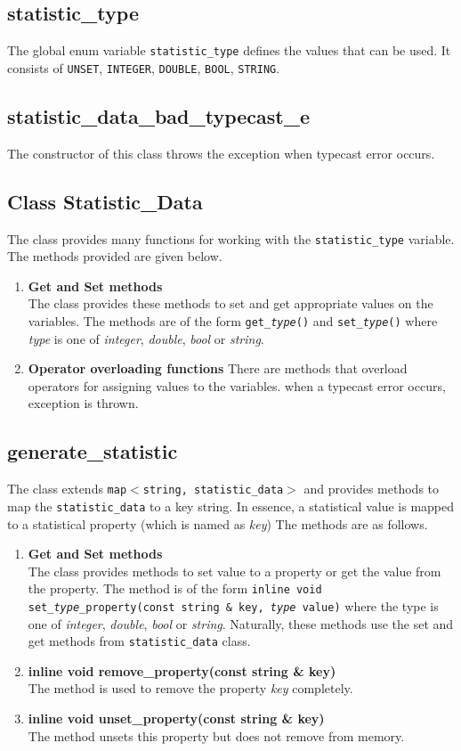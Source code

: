 \subsection*{statistic\_type}
The global enum variable \texttt{statistic\_type} defines the values that can be used. It consists of \texttt{UNSET}, \texttt{INTEGER}, \texttt{DOUBLE}, \texttt{BOOL}, \texttt{STRING}.
\subsection*{statistic\_data\_bad\_typecast\_e}
The constructor of this class throws the exception when typecast error occurs.
\subsection*{Class Statistic\_Data}
The class provides many functions for working with the \texttt{statistic\_type} variable. The methods provided are given below.
\begin{enumerate}
 \item \textbf{Get and Set methods}\\
	The class provides these methods to set and get appropriate values on the variables. The methods are of the form \texttt{get\_\emph{type}()} and \texttt{set\_\emph{type}()} where \emph{type} is one of \emph{integer}, \emph{double}, \emph{bool} or \emph{string}.
 \item \textbf{Operator overloading functions}
	There are methods that overload operators for assigning values to the variables. when a typecast error occurs, exception is thrown.
\end{enumerate}

\subsection*{generate\_statistic}
The class extends \texttt{map$<$string, statistic\_data$>$} and provides methods to map the \texttt{statistic\_data} to a key string. In essence, a statistical value is mapped to a statistical property (which is named as \emph{key}) The methods are as follows.
\begin{enumerate}
 \item \textbf{Get and Set methods} \\
	The class provides methods to set value to a property or get the value from the property. The method is of the form \texttt{inline void set\_\emph{type}\_property(const string \& key, \emph{type} value)} where the type is one of \emph{integer}, \emph{double}, \emph{bool} or \emph{string}. Naturally, these methods use the set and get methods from \texttt{statistic\_data} class.
 \item \textbf{inline void remove\_property(const string \& key)} \\
	The method is used to remove the property \emph{key} completely.
 \item \textbf{inline void unset\_property(const string \& key)} \\
	The method unsets this property but does not remove from memory.
\end{enumerate}




